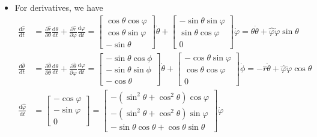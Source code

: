 \documentclass[10pt]{article}
\newcommand{\dee}{\mathrm{d}}
\begin{document}
\begin{itemize}
    \item For derivatives, we have
    \begin{align*}
      \frac{\dee \hat r}{\dee t} 
      &= \frac{\partial \hat r}{\partial \theta} \frac{\dee \theta}{\dee t} + \frac{\partial \hat r}{\partial \varphi} \frac{\dee \varphi}{\dee t}
      = \begin{bmatrix}
        \cos\theta \cos\varphi \\
        \cos\theta \sin\varphi \\
        -\sin\theta
      \end{bmatrix}
      \dot\theta
      + \begin{bmatrix}
        -\sin\theta \sin\varphi \\
        \sin\theta \cos\varphi\\
        0
      \end{bmatrix}
      \dot \varphi
      = \hat \theta \dot \theta + \hat \varphi \dot \varphi \sin\theta\\
      \frac{\dee \hat \theta}{\dee t} 
      &= \frac{\partial \hat \theta}{\partial \theta} \frac{\dee \theta}{\dee t} + \frac{\partial \hat \theta}{\partial \varphi} \frac{\dee \varphi}{\dee t}
      = \begin{bmatrix}
        -\sin\theta \cos\phi \\
        -\sin\theta \sin\phi \\
        -\cos\theta
      \end{bmatrix} \dot\theta + 
      \begin{bmatrix}
         -\cos\theta \sin\varphi\\
         \cos\theta \cos\varphi\\
         0
       \end{bmatrix} \dot\phi
      = -\hat r \dot\theta + \hat\varphi \dot\varphi \cos\theta\\
      \frac{\dee \hat\varphi}{\dee t} 
      &= \begin{bmatrix}
        -\cos\varphi \\
        -\sin\varphi \\
        0
      \end{bmatrix} =
      \begin{bmatrix}
        -(\sin^2\theta + \cos^2\theta)\cos\varphi \\
        -(\sin^2\theta + \cos^2\theta)\sin\varphi \\
        -\sin\theta\cos\theta + \cos\theta\sin\theta
      \end{bmatrix}
      \dot\varphi

\end{align*}
\end{itemize}
\end{document}
